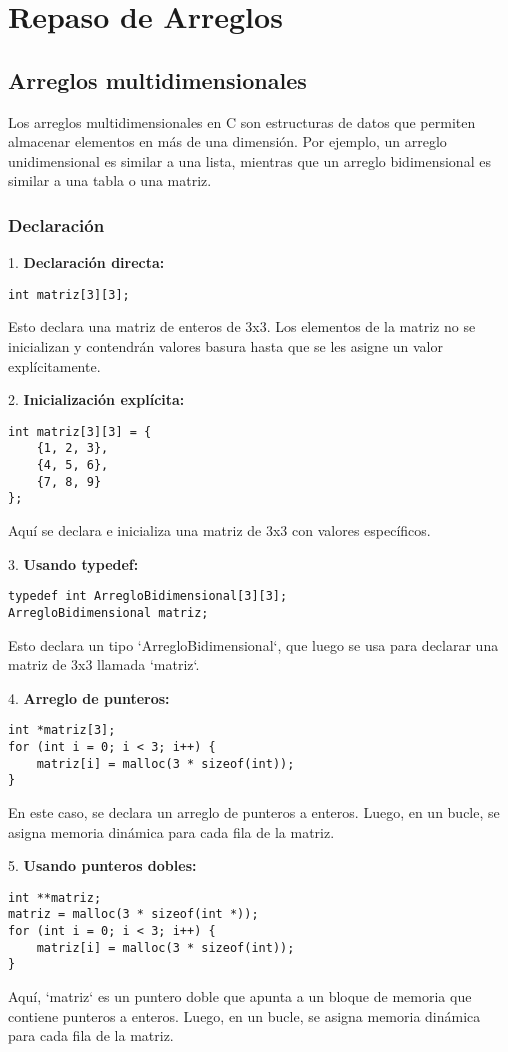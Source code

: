 \section{Repaso de Arreglos}

\subsection{Arreglos multidimensionales}
Los arreglos multidimensionales en C son estructuras de datos que permiten almacenar elementos en más de una dimensión. Por ejemplo, un arreglo unidimensional es similar a una lista, mientras que un arreglo bidimensional es similar a una tabla o una matriz.

\subsubsection{Declaración}

1. \textbf{Declaración directa:}
\begin{verbatim}
int matriz[3][3];
\end{verbatim}
Esto declara una matriz de enteros de 3x3. Los elementos de la matriz no se inicializan y contendrán valores basura hasta que se les asigne un valor explícitamente.

2. \textbf{Inicialización explícita:}
\begin{verbatim}
int matriz[3][3] = {
    {1, 2, 3},
    {4, 5, 6},
    {7, 8, 9}
};
\end{verbatim}
Aquí se declara e inicializa una matriz de 3x3 con valores específicos.

3. \textbf{Usando typedef:}
\begin{verbatim}
typedef int ArregloBidimensional[3][3];
ArregloBidimensional matriz;
\end{verbatim}
Esto declara un tipo `ArregloBidimensional`, que luego se usa para declarar una matriz de 3x3 llamada `matriz`.

4. \textbf{Arreglo de punteros:}
\begin{verbatim}
int *matriz[3];
for (int i = 0; i < 3; i++) {
    matriz[i] = malloc(3 * sizeof(int));
}
\end{verbatim}
En este caso, se declara un arreglo de punteros a enteros. Luego, en un bucle, se asigna memoria dinámica para cada fila de la matriz.

5. \textbf{Usando punteros dobles:}
\begin{verbatim}
int **matriz;
matriz = malloc(3 * sizeof(int *));
for (int i = 0; i < 3; i++) {
    matriz[i] = malloc(3 * sizeof(int));
}
\end{verbatim}
Aquí, `matriz` es un puntero doble que apunta a un bloque de memoria que contiene punteros a enteros. Luego, en un bucle, se asigna memoria dinámica para cada fila de la matriz.

